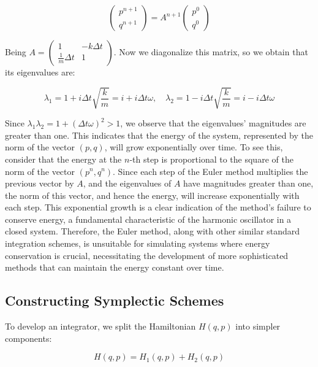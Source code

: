 \documentclass{report}
\begin{document}
\[
	\begin{pmatrix} p^{n+1} \\ q^{n+1} \end{pmatrix} = A^{n+1} \begin{pmatrix} p^{0} \\ q^{0} \end{pmatrix}
\]

Being \(A = \begin{pmatrix} 1 & -k\Delta t \\ \frac{1}{m} \Delta t & 1  \end{pmatrix}\). Now we diagonalize this matrix, so we obtain that its eigenvalues are:

\[
	\lambda_1 = 1 + i\Delta t\sqrt{\frac{k}{m}} = i + i \Delta t \omega, \quad
	\lambda_2 = 1 - i\Delta t\sqrt{\frac{k}{m}} = i - i \Delta t \omega
\]

Since \(\lambda_1 \lambda_2 = 1 + (\Delta t \omega)^2 > 1\), we observe that the eigenvalues' magnitudes are greater than one. This indicates that the energy of the system, represented by the norm of the vector \((p, q)\), will grow exponentially over time. To see this, consider that the energy at the \(n\)-th step is proportional to the square of the norm of the vector \((p^n, q^n)\). Since each step of the Euler method multiplies the previous vector by \(A\), and the eigenvalues of \(A\) have magnitudes greater than one, the norm of this vector, and hence the energy, will increase exponentially with each step. This exponential growth is a clear indication of the method's failure to conserve energy, a fundamental characteristic of the harmonic oscillator in a closed system. Therefore, the Euler method, along with other similar standard integration schemes, is unsuitable for simulating systems where energy conservation is crucial, necessitating the development of more sophisticated methods that can maintain the energy constant over time. 


\subsection{Constructing Symplectic Schemes}
\label{sec:constructing_symplectic_schemes}

To develop an integrator, we split the Hamiltonian \(H(q,p)\) into simpler components:

\begin{equation*}
	H(q,p) = H_1(q,p) + H_2(q,p)
\end{equation*}
\end{document}
